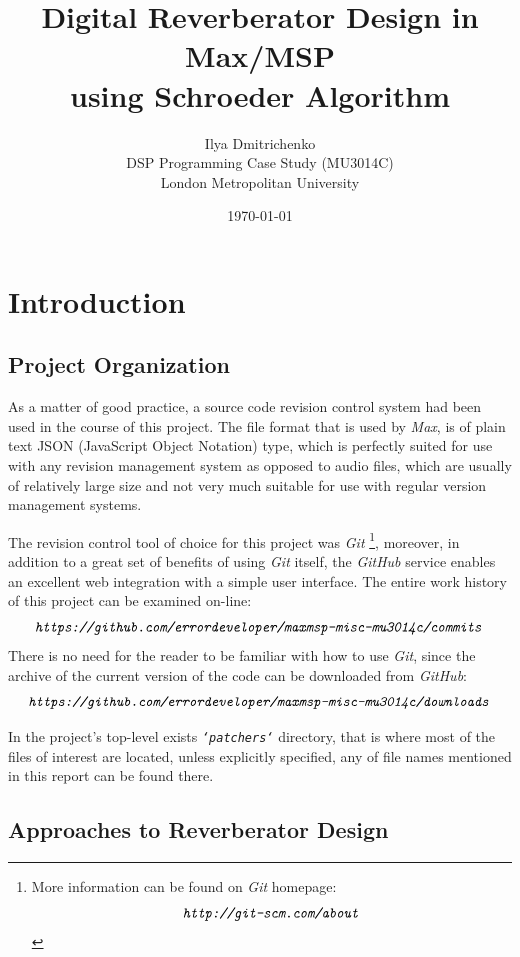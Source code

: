 \documentclass[12pt]{report}
\title{Digital Reverberator Design in Max/MSP\\using Schroeder Algorithm}
\author{Ilya Dmitrichenko
\\\small DSP Programming Case Study (MU3014C)
\\\small London Metropolitan University}
\date{\today}
\newcommand{\URL}[1]{\[ \texttt{\emph{#1}} \]}
\newcommand{\href}[2]{#2 (\texttt{\emph{\url{#1}}})} %
\newcommand{\Href}[2]{{#2}} %
\newcommand{\Href}[2]{\href{#1}{#2}} %
\newcommand{\URL}[1]{\[ \Href{#1}{\texttt{\emph{#1}}} \]}
\begin{document}
\maketitle
\begingroup
\let\clearpage\relax
\tableofcontents
\listoffigures
\endgroup
\pagebreak


\section{Introduction}

  \subsection{Project Organization}

  As a matter of good practice, a source code revision control system had
  been used in the course of this project. The file format that is used by
  \emph{Max}, is of plain text JSON (JavaScript Object Notation) type, which
  is perfectly suited for use with any revision management system as opposed
  to audio files, which are usually of relatively large size and not very
  much suitable for use with regular version management systems. 

  The revision control tool of choice for this project was \emph{Git}
  \footnote{More information can be found on \emph{Git} homepage:
  \URL{http://git-scm.com/about}}, moreover, in addition to a great set of
  benefits of using \emph{Git} itself, the \emph{GitHub} service enables an
  excellent web integration with a simple user interface. The entire work
  history of this project can be examined on-line:
  \URL{https://github.com/errordeveloper/maxmsp-misc-mu3014c/commits}
  There is no need for the reader to be familiar with how to use \emph{Git},
  since the archive of the current version of the code can be downloaded
  from \emph{GitHub}:
  \URL{https://github.com/errordeveloper/maxmsp-misc-mu3014c/downloads}


  In the project's top-level exists \emph{\texttt{`patchers`}} directory, that
  is where most of the files of interest are located, unless explicitly specified,
  any of file names mentioned in this report can be found there.


  \subsection{Approaches to Reverberator Design}
\end{document}
